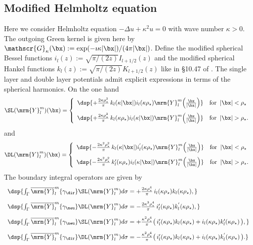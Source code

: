 \documentclass[a4paper,11pt]{article}
\begin{document}
\subsection{Modified Helmholtz equation}\label{ModifiedHelmholtz3D}

Here we consider Helmholtz equation $-\Delta u+\kappa^{2} u =0$ with wave number $\kappa>0$. The outgoing Green kernel
is given here by $\mathscr{G}_{\kappa}(\bx):=\exp(-\imath\kappa\vert\bx\vert)/(4\pi\vert \bx\vert)$.
Define the modified spherical Bessel functions $i_{l}(z) := \sqrt{\pi/(2z)}I_{l+1/2}(z)$ and the modified spherical Hankel functions
$k_{l}(z):= \sqrt{\pi/(2z)}K_{l+1/2}(z)$ like in \S 10.47 of \cite{MR2723248}.
The single layer and double layer potentials admit explicit expressions in terms of the spherical harmonics.
On the one hand\\
$$
\SL(\mrm{Y}_{l}^{m})(\bx) =
\left\{\begin{array}{ll}
\dsp{+\frac{2 \kappa\rho_{\star}^{2}}{\pi}\, k_{l}(\kappa\vert \bx\vert )i_{l}(\kappa\rho_{\star})\mrm{Y}_{l}^{m}\Big(\frac{\bx}{\vert\bx\vert}\Big)} & \textrm{for}\;\;\vert \bx\vert<\rho_{\star}\\[10pt]
\dsp{+\frac{2 \kappa\rho_{\star}^{2}}{\pi}\, k_{l}(\kappa\rho_{\star})i_{l}(\kappa\vert \bx\vert)\mrm{Y}_{l}^{m}\Big(\frac{\bx}{\vert\bx\vert}\Big)   } & \textrm{for}\;\;\vert\bx\vert>\rho_{\star}.
\end{array}\right.
$$
and
$$
\DL(\mrm{Y}_{l}^{m})(\bx) =
\left\{\begin{array}{ll}
\dsp{-\frac{2\kappa^{2}\rho_{\star}^{2}}{\pi}\, k_{l}(\kappa\vert \bx\vert)i^{'}_{l}(\kappa\rho_{\star})
\mrm{Y}_{l}^{m}\Big(\frac{\bx}{\vert\bx\vert}\Big) }
& \textrm{for}\;\;\vert\bx\vert<\rho_{\star}\\[10pt]
\dsp{-\frac{2\kappa^{2}\rho_{\star}^{2}}{\pi}\, k_{l}'(\kappa \rho_{\star})i_{l}(\kappa\vert \bx\vert)
\mrm{Y}_{l}^{m}\Big(\frac{\bx}{\vert\bx\vert}\Big) }
& \textrm{for}\;\;\vert\bx\vert>\rho_{\star}.
\end{array}\right.
$$
The boundary integral operators are given by
$$
\begin{array}{l}
\dsp{ \int_{\Gamma}\overline{\mrm{Y}}_{l}^{m}\{\gamma_{\dir}\}\SL(\mrm{Y}_{l}^{m}) d\sigma
= +\frac{2\kappa \rho_{\star}^{4}}{\pi}\,i_{l}(\kappa\rho_{\star})k_{l}(\kappa\rho_{\star}), }\\[10pt]
\dsp{ \int_{\Gamma}\overline{\mrm{Y}}_{l}^{m}\{\gamma_{\neu}\}\DL(\mrm{Y}_{l}^{m}) d\sigma
= -\frac{2\kappa^{3}\rho_{\star}^{4}}{\pi} \,i_{l}'(\kappa\rho_{\star})k_{l}^{'}(\kappa\rho_{\star}), }\\[10pt]
\dsp{ \int_{\Gamma}\overline{\mrm{Y}}_{l}^{m}\{\gamma_{\neu}\}\SL(\mrm{Y}_{l}^{m}) d\sigma
= +\frac{\kappa^{2}\rho_{\star}^{4}}{\pi}
\big( \,i_{l}'(\kappa\rho_{\star})k_{l}(\kappa\rho_{\star}) +  i_{l}(\kappa\rho_{\star})k_{l}'(\kappa\rho_{\star})\,\big), }\\[10pt]
\dsp{ \int_{\Gamma}\overline{\mrm{Y}}_{l}^{m}\{\gamma_{\dir}\}\DL(\mrm{Y}_{l}^{m}) d\sigma
= -\frac{\kappa^{2}\rho_{\star}^{4}}{\pi}
\big( \,i_{l}'(\kappa\rho_{\star})k_{l}(\kappa\rho_{\star}) +
i_{l}(\kappa\rho_{\star})k_{l}^{'}(\kappa\rho_{\star})\,\big). }
\end{array}
$$
\end{document}
